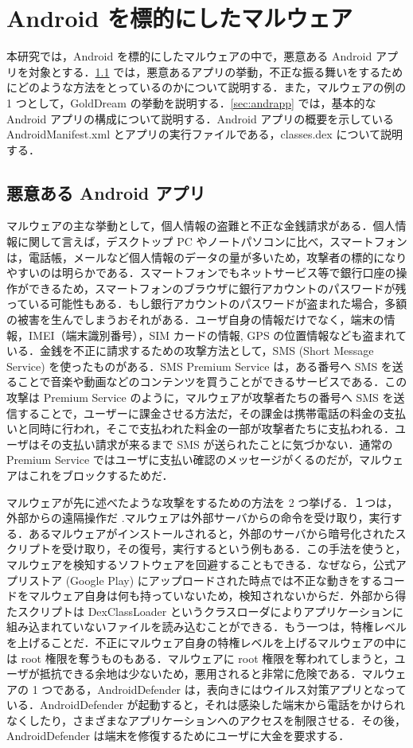\section{Android  を標的にしたマルウェア}
本研究では，Android を標的にしたマルウェアの中で，悪意ある Android アプリを対象とする．\ref{sec:malware} では，悪意あるアプリの挙動，不正な振る舞いをするためにどのような方法をとっているのかについて説明する．また，マルウェアの例の 1 つとして，GoldDream の挙動を説明する．\ref{sec:andrapp} では，基本的な Android アプリの構成について説明する．Android アプリの概要を示している AndroidManifest.xml とアプリの実行ファイルである，classes.dex について説明する．
\subsection{悪意ある Android  アプリ}
\label{sec:malware}
マルウェアの主な挙動として，個人情報の盗難と不正な金銭請求がある．個人情報に関して言えば，デスクトップ PC やノートパソコンに比べ，スマートフォンは，電話帳，メールなど個人情報のデータの量が多いため，攻撃者の標的になりやすいのは明らかである．スマートフォンでもネットサービス等で銀行口座の操作ができるため，スマートフォンのブラウザに銀行アカウントのパスワードが残っている可能性もある．もし銀行アカウントのパスワードが盗まれた場合，多額の被害を生んでしまうおそれがある．ユーザ自身の情報だけでなく，端末の情報，IMEI（端末識別番号），SIM カードの情報, GPS の位置情報なども盗まれている．金銭を不正に請求するための攻撃方法として，SMS (Short Message Service) を使ったものがある．SMS Premium Service は，ある番号へ SMS を送ることで音楽や動画などのコンテンツを買うことができるサービスである．この攻撃は Premium Service のように，マルウェアが攻撃者たちの番号へ SMS を送信することで，ユーザーに課金させる方法だ，その課金は携帯電話の料金の支払いと同時に行われ，そこで支払われた料金の一部が攻撃者たちに支払われる．ユーザはその支払い請求が来るまで SMS が送られたことに気づかない．通常の Premium Service ではユーザに支払い確認のメッセージがくるのだが，マルウェアはこれをブロックするためだ．

マルウェアが先に述べたような攻撃をするための方法を 2 つ挙げる．１つは，外部からの遠隔操作だ  \cite{remotectrl} .マルウェアは外部サーバからの命令を受け取り，実行する．あるマルウェアがインストールされると，外部のサーバから暗号化されたスクリプトを受け取り，その復号，実行するという例もある．この手法を使うと，マルウェアを検知するソフトウェアを回避することもできる．なぜなら，公式アプリストア (Google Play)  にアップロードされた時点では不正な動きをするコードをマルウェア自身は何も持っていないため，検知されないからだ．外部から得たスクリプトは DexClassLoader というクラスローダによりアプリケーションに組み込まれていないファイルを読み込むことができる．もう一つは，特権レベルを上げることだ．不正にマルウェア自身の特権レベルを上げるマルウェアの中には root 権限を奪うものもある．マルウェアに root 権限を奪われてしまうと，ユーザが抵抗できる余地は少ないため，悪用されると非常に危険である．マルウェアの 1 つである，AndroidDefender \cite{sopho} は，表向きにはウイルス対策アプリとなっている．AndroidDefender が起動すると，それは感染した端末から電話をかけられなくしたり，さまざまなアプリケーションへのアクセスを制限させる．その後，AndroidDefender は端末を修復するためにユーザに大金を要求する．
 
